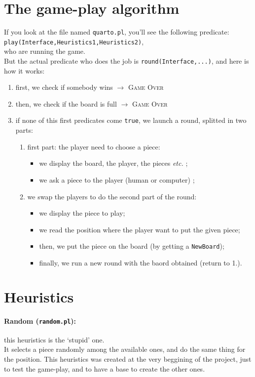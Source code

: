 \documentclass[a4paper,11pt]{article}
\newcommand{\tw}[1]{\texttt{#1}}
\begin{document}
	\section{The game-play algorithm}
		If you look at the file named \tw{quarto.pl}, you'll see the following predicate:\\
			\tw{play(Interface,Heuristics1,Heuristics2)},\\
		who are running the game. \\
		But the actual predicate who does the job is \tw{round(Interface,...)}, and here is how it works:
		\begin{enumerate}
			\item first, we check if somebody wins $\rightarrow$ \textsc{Game Over}
			\item then, we check if the board is full $\rightarrow$ \textsc{Game Over}
			\item if none of this first predicates come \tw{true}, we launch a round, splitted in two parts:
			\begin{enumerate}
				\item first part: the player need to choose a piece:
				\begin{itemize}
					\item we display the board, the player, the pieces \textit{etc.} ;
					\item we ask a piece to the player (human or computer) ;
				\end{itemize}
				\item we swap the players to do the second part of the round:
				\begin{itemize}
					\item we display the piece to play;
					\item we read the position where the player want to put the given piece;
					\item then, we put the piece on the board (by getting a \tw{NewBoard});
					\item finally, we run a new round with the baord obtained (return to 1.).
				\end{itemize}
			\end{enumerate}
		\end{enumerate}

	\section{Heuristics}
		\paragraph{Random (\tw{random.pl}):} this heuristics is the `stupid' one. \\
		It selects a piece randomly among the available ones, and do the same thing for the position. This heuristics was created at the very beggining of the project, just to test the game-play, and to have a base to create the other ones.\\[2em]
		
\end{document}
